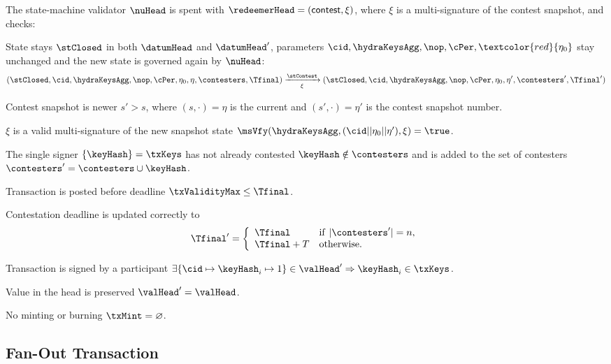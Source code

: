 \begin{samepage}
	\noindent The state-machine validator $\nuHead$ is spent with
	$\redeemerHead = (\mathsf{contest}, \xi)$, where $\xi$ is a multi-signature of
	the contest snapshot, and checks:
	\begin{menumerate}
		\item State stays $\stClosed$ in both $\datumHead$ and $\datumHead'$,
		parameters $\cid,\hydraKeysAgg,\nop,\cPer, \textcolor{red}{\eta_{0}}$ stay
		unchanged and the new state is governed again by $\nuHead$:
		\[
			(\stClosed,\cid,\hydraKeysAgg,\nop,\cPer,\eta_0,\eta,\contesters,\Tfinal) \xrightarrow[\xi]{\stContest} (\stClosed,\cid,\hydraKeysAgg,\nop,\cPer,\eta_0,\eta',\contesters',\Tfinal')
		\]
		\item Contest snapshot is newer $s' > s$, where $(s, \cdot) = \eta$ is the
		current and $(s', \cdot) = \eta'$ is the contest snapshot number.
		\item $\xi$ is a valid multi-signature of the new snapshot state
		$\msVfy(\hydraKeysAgg,(\cid || \eta_{0} || \eta'),\xi) = \true$.
		\item The single signer $\{\keyHash\} = \txKeys$ has not already contested
		$\keyHash \notin \contesters$ and is added to the set of contesters
		$\contesters' = \contesters \cup \keyHash$.
		\item Transaction is posted before deadline $\txValidityMax \leq \Tfinal$.
		\item Contestation deadline is updated correctly to
		\[
			\Tfinal' = \left\{\begin{array}{ll}
				\Tfinal     & \mathrm{if} ~ |\contesters'| = n, \\
				\Tfinal + T & \mathrm{otherwise.}
			\end{array}\right.
		\]
		\item Transaction is signed by a participant
		$\exists \{\cid \mapsto \keyHash_{i} \mapsto 1\} \in \valHead' \Rightarrow \keyHash_{i} \in \txKeys$.
		\item Value in the head is preserved $\valHead' = \valHead$.
		\item No minting or burning $\txMint = \varnothing$.
	\end{menumerate}
\end{samepage}

\subsection{Fan-Out Transaction}

